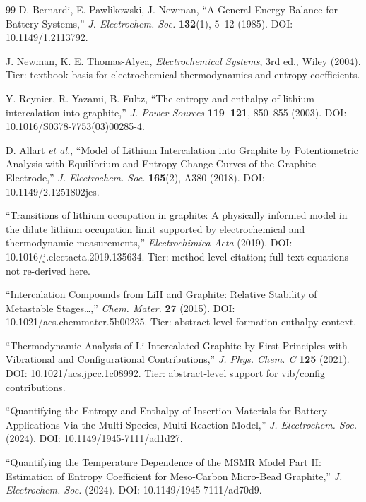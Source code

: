 \documentclass[11pt,a4paper]{article}
\begin{document}
\begin{thebibliography}{99}
D. Bernardi, E. Pawlikowski, J. Newman,
``A General Energy Balance for Battery Systems,''
\emph{J. Electrochem. Soc.} \textbf{132}(1), 5--12 (1985).
DOI: 10.1149/1.2113792.

J. Newman, K. E. Thomas-Alyea,
\emph{Electrochemical Systems}, 3rd ed., Wiley (2004).
Tier: textbook basis for electrochemical thermodynamics and entropy coefficients.

Y. Reynier, R. Yazami, B. Fultz,
``The entropy and enthalpy of lithium intercalation into graphite,''
\emph{J. Power Sources} \textbf{119--121}, 850--855 (2003).
DOI: 10.1016/S0378-7753(03)00285-4.

D. Allart \emph{et al.},
``Model of Lithium Intercalation into Graphite by Potentiometric Analysis with
Equilibrium and Entropy Change Curves of the Graphite Electrode,''
\emph{J. Electrochem. Soc.} \textbf{165}(2), A380 (2018).
DOI: 10.1149/2.1251802jes.

``Transitions of lithium occupation in graphite: A physically informed model in the dilute
lithium occupation limit supported by electrochemical and thermodynamic measurements,''
\emph{Electrochimica Acta} (2019).
DOI: 10.1016/j.electacta.2019.135634.
Tier: method-level citation; full-text equations not re-derived here.

``Intercalation Compounds from LiH and Graphite: Relative Stability of Metastable Stages\ldots,''
\emph{Chem. Mater.} \textbf{27} (2015).
DOI: 10.1021/acs.chemmater.5b00235.
Tier: abstract-level formation enthalpy context.

``Thermodynamic Analysis of Li-Intercalated Graphite by First-Principles with
Vibrational and Configurational Contributions,''
\emph{J. Phys. Chem. C} \textbf{125} (2021).
DOI: 10.1021/acs.jpcc.1c08992.
Tier: abstract-level support for vib/config contributions.

``Quantifying the Entropy and Enthalpy of Insertion Materials for Battery Applications
Via the Multi-Species, Multi-Reaction Model,''
\emph{J. Electrochem. Soc.} (2024).
DOI: 10.1149/1945-7111/ad1d27.

``Quantifying the Temperature Dependence of the MSMR Model Part II: Estimation of
Entropy Coefficient for Meso-Carbon Micro-Bead Graphite,''
\emph{J. Electrochem. Soc.} (2024).
DOI: 10.1149/1945-7111/ad70d9.


\end{thebibliography}
\end{document}
